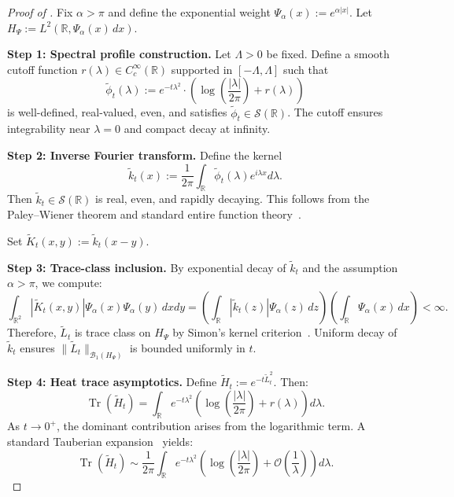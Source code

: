 \begin{proof}[Proof of ]
Fix $\alpha > \pi$ and define the exponential weight $\Psi_\alpha(x) := e^{\alpha|x|}$. Let $H_\Psi := L^2(\mathbb{R}, \Psi_\alpha(x)\, dx)$.

\vspace{1em}
\noindent\textbf{Step 1: Spectral profile construction.}  
Let $\Lambda > 0$ be fixed. Define a smooth cutoff function $r(\lambda) \in C_c^\infty(\mathbb{R})$ supported in $[-\Lambda, \Lambda]$ such that
\[
\tilde{\phi}_t(\lambda) := e^{-t \lambda^2} \cdot \left( \log\left( \frac{|\lambda|}{2\pi} \right) + r(\lambda) \right)
\]
is well-defined, real-valued, even, and satisfies $\tilde{\phi}_t \in \mathcal{S}(\mathbb{R})$. The cutoff ensures integrability near $\lambda = 0$ and compact decay at infinity.

\vspace{1em}
\noindent\textbf{Step 2: Inverse Fourier transform.}  
Define the kernel
\[
\tilde{k}_t(x) := \frac{1}{2\pi} \int_{\mathbb{R}} \tilde{\phi}_t(\lambda) e^{i\lambda x} d\lambda.
\]
Then $\tilde{k}_t \in \mathcal{S}(\mathbb{R})$ is real, even, and rapidly decaying. This follows from the Paley–Wiener theorem and standard entire function theory~\cite[Thm.~3.2.4]{Levin1996EntireLectures}.

Set $\tilde{K}_t(x, y) := \tilde{k}_t(x - y)$.

\vspace{1em}
\noindent\textbf{Step 3: Trace-class inclusion.}  
By exponential decay of $\tilde{k}_t$ and the assumption $\alpha > \pi$, we compute:
\[
\int_{\mathbb{R}^2} |\tilde{K}_t(x, y)| \Psi_\alpha(x)\Psi_\alpha(y)\, dx dy = \left( \int_{\mathbb{R}} |\tilde{k}_t(z)| \Psi_\alpha(z)\, dz \right) \left( \int_{\mathbb{R}} \Psi_\alpha(x)\, dx \right) < \infty.
\]
Therefore, $\tilde{L}_t$ is trace class on $H_\Psi$ by Simon’s kernel criterion~\cite[Thm.~4.2]{Simon2005TraceIdeals}. Uniform decay of $\tilde{k}_t$ ensures $\|\tilde{L}_t\|_{\mathcal{B}_1(H_\Psi)}$ is bounded uniformly in $t$.

\vspace{1em}
\noindent\textbf{Step 4: Heat trace asymptotics.}  
Define $\tilde{H}_t := e^{-t \tilde{L}_t^2}$. Then:
\[
\operatorname{Tr}(\tilde{H}_t) = \int_{\mathbb{R}} e^{-t \lambda^2} \left( \log\left( \frac{|\lambda|}{2\pi} \right) + r(\lambda) \right) d\lambda.
\]
As $t \to 0^+$, the dominant contribution arises from the logarithmic term. A standard Tauberian expansion~\cite[Ch.~III]{Korevaar2004Tauberian} yields:
\[
\operatorname{Tr}(\tilde{H}_t) \sim \frac{1}{2\pi} \int_{\mathbb{R}} e^{-t \lambda^2} \left( \log\left( \frac{|\lambda|}{2\pi} \right) + \mathcal{O}\left( \frac{1}{\lambda} \right) \right) d\lambda.
\]


\end{proof}
